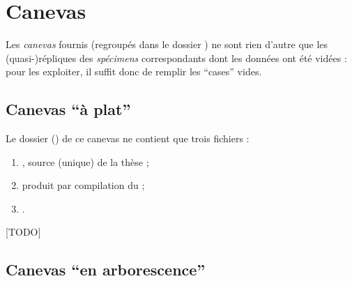 


\section{Canevas}
\label{sec-canevas}

Les \emph{canevas} fournis (regroupés dans le dossier ) ne sont
rien d'autre que les (quasi-)répliques des \emph{spécimens} correspondants dont
les données ont été vidées : pour les exploiter, il suffit donc de remplir les
\enquote{cases} vides.

\subsection{Canevas \enquote{à plat}}
\label{sec-canevas-a-plat}

Le dossier () de ce canevas ne contient que trois fichiers :
\begin{enumerate}
\item {}, source  (unique) de la thèse  ;
\item {} produit par compilation du  ;
\item {}.
\end{enumerate}

[TODO]

\subsection{Canevas \enquote{en arborescence}}
\label{sec-canevas-arborescence}

